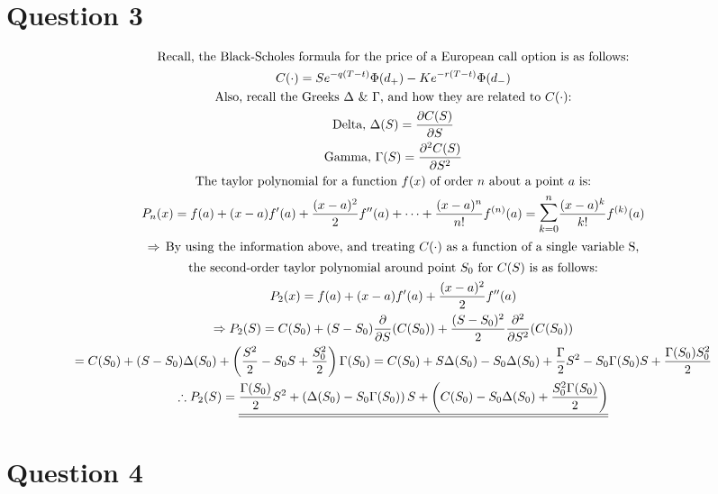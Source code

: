 \documentclass[letterpaper,10pt]{article}
\newcommand{\doubleu}[1]{\underline{\underline{#1}}}
\newcommand{\partiald}[2]{\frac{\partial #1}{\partial #2}}
\begin{document}
	\section{Question 3}
	 	\begin{gather*}
			\text{Recall, the Black-Scholes formula for the price of a European call option is as follows:} \\
			C(\cdot) = Se^{-q(T-t)} \Phi(d_+) - Ke^{-r(T-t)} \Phi(d_-) \\
			\text{Also, recall the Greeks $\Delta$ \& $\Gamma$, and how they are related to $C(\cdot)$:} \\
			\text{Delta, } \Delta (S) = \partiald{C(S)}{S} \\
			\text{Gamma, } \Gamma (S) = \partiald{^2C(S)}{S^2} \\
			\text{The taylor polynomial for a function $f(x)$ of order $n$ about a point $a$ is:} \\
			P_n(x) = f(a) + (x-a) f'(a) + \frac{(x-a)^2}{2}f''(a) + \dotsb + \frac{(x-a)^n}{n!}f^{(n)}(a) = \mathlarger{\mathlarger{\sum}}_{k=0}^n \frac{(x-a)^k}{k!} f^{(k)}(a) \\
			\Rightarrow \, \text{By using the information above, and treating $C(\cdot)$ as a function of a single variable S,} \\
			\text{the second-order taylor polynomial around point $S_0$ for $C(S)$ is as follows:} \\
			P_2(x) = f(a) + (x-a)f'(a) + \frac{(x-a)^2}{2}f''(a) \\
			\Rightarrow P_2(S) = C(S_0) + (S-S_0)\partiald{}{S}(C(S_0)) + \frac{(S-S_0)^2}{2}\partiald{^2}{S^2}(C(S_0)) \\
			= C(S_0) + (S-S_0)\Delta(S_0) + \left(\frac{S^2}{2} - S_0S + \frac{S_0^2}{2}\right)\Gamma(S_0) = C(S_0) + S \Delta(S_0) -  S_0 \Delta(S_0)+ \frac{\Gamma}{2}S^2 - S_0\Gamma(S_0)S + \frac{\Gamma(S_0)S_0^2}{2} \\
			\therefore P_2(S) = \doubleu{ \frac{\Gamma(S_0)}{2} S^2 + \left( \Delta(S_0) - S_0 \Gamma(S_0) \right) S + \left( C(S_0) - S_0\Delta(S_0) + \frac{S_0^2\Gamma(S_0)}{2} \right) }
		\end{gather*}


	\section{Question 4}
\end{document}
